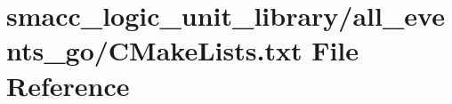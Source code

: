 \hypertarget{logic__unit__library_2all__events__go_2CMakeLists_8txt}{}\section{smacc\+\_\+logic\+\_\+unit\+\_\+library/all\+\_\+events\+\_\+go/\+C\+Make\+Lists.txt File Reference}
\label{logic__unit__library_2all__events__go_2CMakeLists_8txt}
